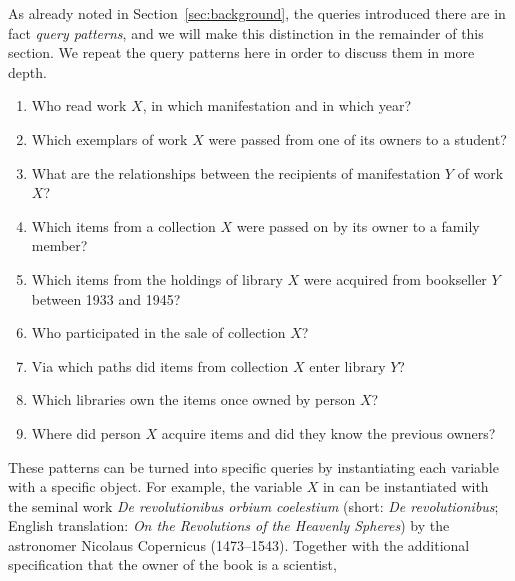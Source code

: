 As already noted in Section~\ref{sec:background}, the queries introduced there
are in fact \emph{query patterns}, and we will make this distinction in the remainder
of this section. We repeat the query patterns here in order to discuss them in more depth.
%
\begin{enumerate}
  \item[\exaquery{1}]
    Who read %
    work $X$, in which manifestation and in which year?
  \item[\exaquery{2}]
    Which exemplars
    of work $X$
    were passed from one of its owners to a student?
  \item[\exaquery{3}]
    What are the relationships between the recipients of manifestation $Y$ of work $X$?
  \item[\exaquery{4}]
    Which items from a collection $X$ were passed on by its owner to a family member?
  \item[\exaquery{5}]
    Which items from the holdings of library $X$ were acquired from bookseller $Y$
    between 1933 and 1945?
  \item[\exaquery{6}]
    Who participated in the sale of collection $X$?
  \item[\exaquery{7}]
    Via which paths did items from collection $X$ enter library $Y$?
  \item[\exaquery{8}]
    Which libraries own the items once owned by person $X$?
  \item[\exaquery{9}]
    Where did person $X$ acquire items and did they know the previous owners?
\end{enumerate}
%
These patterns can be turned into specific queries by instantiating each variable with a specific object.
For example, the variable $X$
in  can be instantiated with the seminal work \emph{\foreignlanguage{latin}{De revolutionibus orbium coelestium}}
(short: \emph{\foreignlanguage{latin}{De revolutionibus}}; English translation: \emph{On the Revolutions of the Heavenly Spheres}) \autocite{Kopernikus1543}
by the astronomer Nicolaus Copernicus (1473–1543).
Together with the additional specification that the owner of the book is a scientist,
